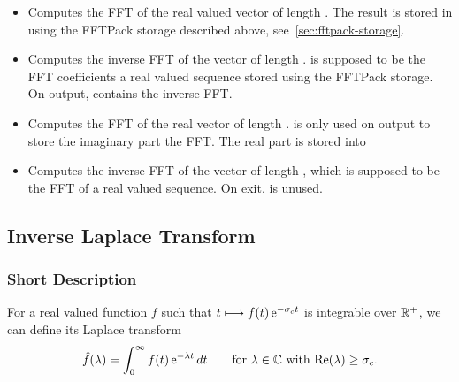 \begin{itemize}
\item {}
  \sshortdescribe Computes the FFT of the real valued vector  of
  length . The result is stored in  using the FFTPack storage
  described above, see~\ref{sec:fftpack-storage}.

\item {}
  \sshortdescribe Computes the inverse FFT of the vector  of length
  .  is supposed to be the FFT coefficients a real valued
  sequence stored using the FFTPack storage. On output,  contains
  the inverse FFT.

\item {}
  \sshortdescribe Computes the FFT of the real vector  of length .
   is only used on output to store the imaginary part the FFT. The
  real part is stored into 
  
\item {}
  \sshortdescribe Computes the inverse FFT of the vector  of
  length , which is supposed to be the FFT of a real valued
  sequence. On exit,  is unused. 
\end{itemize}

\subsection{Inverse Laplace Transform}
\subsubsection{Short Description}

For a real valued function $f$ such that $t \longmapsto f(t) \operatorname{e}^{ - \sigma_c
  t }$ is integrable over ${\mathbb R}^+$, we can define its Laplace transform
\begin{equation*}
  \hat{f}(\lambda) = \int_0^\infty f(t) \operatorname{e}^{ - \lambda t } dt \qquad
  \mbox{for $\lambda \in {\mathbb C}$ with $\operatorname{Re}(\lambda) \ge \sigma_c$}.
\end{equation*}

